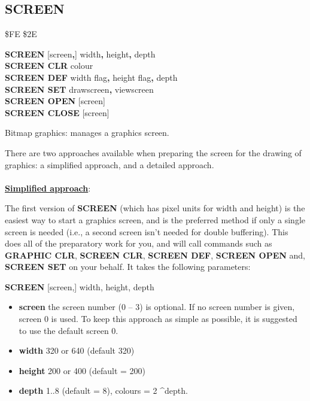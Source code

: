 \subsection{SCREEN}
\begin{description}[leftmargin=2cm,style=nextline]
\item [Token:] \$FE \$2E
\item [Format:] {\bf SCREEN} [screen{\bf,}] width{\bf,} height{\bf,} depth \\
                {\bf SCREEN CLR} colour \\
                {\bf SCREEN DEF} width flag{\bf,} height flag{\bf,} depth \\
                {\bf SCREEN SET} drawscreen{\bf,} viewscreen \\
                {\bf SCREEN OPEN} [screen] \\
                {\bf SCREEN CLOSE} [screen]

\item [Usage:] Bitmap graphics: manages a graphics screen.

               There are two approaches available when preparing the screen for the
               drawing of graphics: a simplified approach, and a detailed approach.
\\
\\
    \underline{{\bf Simplified approach}}:

               The first version of {\bf SCREEN} (which has pixel
               units for width and height) is the easiest
               way to start a graphics screen, and is the preferred
               method if only a single screen is needed (i.e., a second screen
               isn't needed for double buffering). This does all of the
               preparatory work for you, and will call commands such as
               {\bf GRAPHIC CLR}, {\bf SCREEN CLR}, {\bf SCREEN DEF},
               {\bf SCREEN OPEN} and, {\bf SCREEN SET}
               on your behalf. It takes the following parameters:

               {\bf SCREEN} [screen,] width, height, depth

               \begin{itemize}
                \item {\bf screen} the screen number (0 -- 3) is optional.
                If no screen number is given, screen 0 is used. To keep
                   this approach as simple as possible, it is suggested to
                   use the default screen 0.
                \item {\bf width} 320 or 640 (default 320)
                \item {\bf height} 200 or 400 (default = 200)
                \item {\bf depth} 1..8 (default = 8),
                   colours = 2 \textasciicircum depth.
               \end{itemize}


\end{description}
